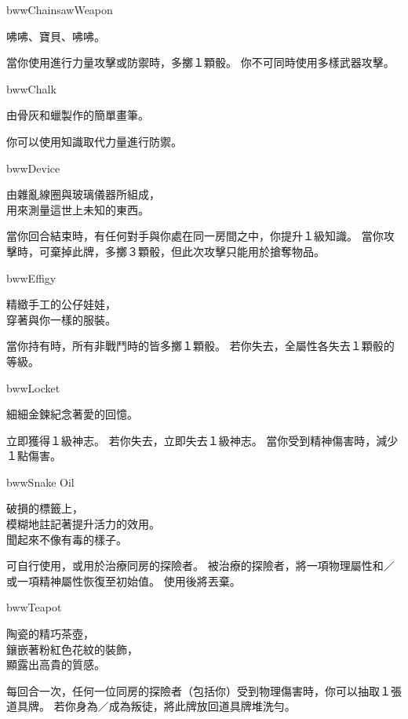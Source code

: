 \linebreak[0]%
\begin{ItemCard}{bww}{Chainsaw}{Weapon}
  \begin{CardStory}
    咈咈、寶貝、咈咈。
  \end{CardStory}
  當你使用\ThisName{}進行力量攻擊或防禦時，多擲１顆骰。\smallbreak
  你不可同時使用多樣武器攻擊。\smallbreak
\end{ItemCard}%
\linebreak[0]%
\begin{ItemCard}{bww}{Chalk}{}
  \begin{CardStory}
    由骨灰和蠟製作的簡單畫筆。
  \end{CardStory}
  你可以使用知識取代力量進行防禦。\smallbreak
\end{ItemCard}%
\linebreak[0]%
\begin{ItemCard}{bww}{Device}{}
  \begin{CardStory}
    由雜亂線圈與玻璃儀器所組成，\\
    用來測量這世上未知的東西。
  \end{CardStory}
  當你回合結束時，有任何對手與你處在同一房間之中，你提升１級知識。\smallbreak
  當你攻擊時，可棄掉此牌，多擲３顆骰，但此次攻擊只能用於搶奪物品。\smallbreak
\end{ItemCard}%
\linebreak[0]%
\begin{ItemCard}{bww}{Effigy}{}
  \begin{CardStory}
    精緻手工的公仔娃娃，\\
    穿著與你一樣的服裝。
  \end{CardStory}
  當你持有\ThisName{}時，所有非戰鬥時的皆多擲１顆骰。\smallbreak
  若你失去\ThisName{}，全屬性各失去１顆骰的等級。\smallbreak
\end{ItemCard}%
\linebreak[0]%
\begin{ItemCard}{bww}{Locket}{}
  \begin{CardStory}
    細細金鍊紀念著愛的回憶。
  \end{CardStory}
  立即獲得１級神志。\smallbreak
  若你失去\ThisName{}，立即失去１級神志。\smallbreak
  當你受到精神傷害時，減少１點傷害。\smallbreak
\end{ItemCard}%
\linebreak[0]%
\begin{ItemCard}{bww}{Snake Oil}{}
  \begin{CardStory}
    破損的標籤上，\\
    模糊地註記著提升活力的效用。\\
    聞起來不像有毒的樣子。
  \end{CardStory}
  可自行使用，或用於治療同房的探險者。\smallbreak
  被\ThisName{}治療的探險者，將一項物理屬性和／或一項精神屬性恢復至初始值。\smallbreak
  使用後將\ThisName{}丟棄。\smallbreak
\end{ItemCard}%
\linebreak[0]%
\begin{ItemCard}{bww}{Teapot}{}
  \begin{CardStory}
    陶瓷的精巧茶壺，\\
    鑲嵌著粉紅色花紋的裝飾，\\
    顯露出高貴的質感。
  \end{CardStory}
  每回合一次，任何一位同房的探險者（包括你）受到物理傷害時，你可以抽取１張道具牌。\smallbreak
  若你身為／成為叛徒，將此牌放回道具牌堆洗勻。\smallbreak
\end{ItemCard}%
\linebreak[0]%
